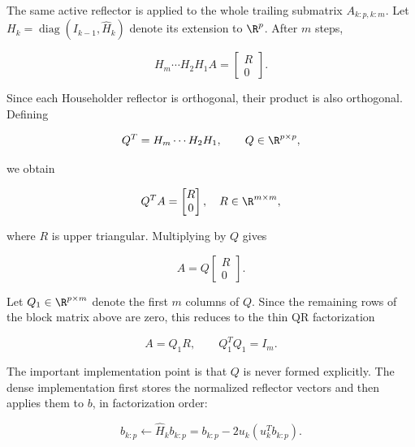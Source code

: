 \noindent The same active reflector is applied to the whole trailing submatrix
$A_{k:p,k:m}$. Let $H_k=\operatorname{diag}(I_{k-1},\widehat H_k)$ denote
its extension to $\R^p$. After $m$ steps,

\begin{equation}
    H_m\cdots H_2H_1 A =
    \begin{bmatrix}
        R \\ 0
    \end{bmatrix}.
\end{equation}

\noindent Since each Householder reflector is orthogonal, their product is also
orthogonal. Defining

\begin{equation}
    Q^T = H_m \cdots H_2 H_1,
    \qquad
    Q \in \R^{p\times p},
\end{equation}

\noindent we obtain

\begin{equation}
    Q^T A =
    \begin{bmatrix}
        R \\
        0
    \end{bmatrix},
    \quad
    R \in \R^{m\times m},
\end{equation}

\noindent where $R$ is upper triangular. Multiplying by $Q$ gives

\begin{equation}
    A =
    Q
    \begin{bmatrix}
        R \\
        0
    \end{bmatrix}.
\end{equation}

\noindent Let $Q_1 \in \R^{p\times m}$ denote the first $m$ columns of $Q$. Since the remaining rows of the block matrix above are zero, this reduces to the thin QR factorization

\begin{equation}
    A = Q_1 R,
    \qquad
    Q_1^T Q_1 = I_m.
\end{equation}

\noindent The important implementation point is that $Q$ is never formed explicitly.
The dense implementation first stores the normalized reflector vectors and then
applies them to $b$, in factorization order:

\begin{equation}
    b_{k:p} \leftarrow \widehat H_k b_{k:p}
    =
    b_{k:p} - 2u_k \left(u_k^T b_{k:p}\right).
\end{equation}

